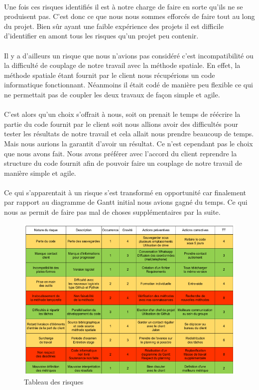     \paragraph{}
    Une fois ces risques identifiés il est à notre charge de faire en sorte qu'ils ne se produisent pas. C'est donc ce que nous nous sommes efforcés de faire tout au long du projet. Bien sûr ayant une faible expérience des projets il est difficile d'identifier en amont tous les risques qu'un projet peu contenir.
    \paragraph{}
    Il y a d'ailleurs un risque que nous n'avions pas considéré c'est incompatibilité ou la difficulté de couplage de notre travail avec la méthode spatiale. En effet, la méthode spatiale étant fournit par le client nous récupérions un code informatique fonctionnant. Néanmoins il était codé de manière peu flexible ce qui ne permettait pas de coupler les deux travaux de façon simple et agile.
    \paragraph{}
    C'est alors qu'un choix s'offrait à nous, soit on prenait le temps de réécrire la partie du code fournit par le client soit nous allions avoir des difficultés pour tester les résultats de notre travail et cela allait nous prendre beaucoup de temps. Mais nous aurions la garantit d'avoir un résultat. Ce n'est cependant pas le choix que nous avons fait. Nous avons préférer avec l'accord du client reprendre la structure du code fournit afin de pouvoir faire un couplage de notre travail de manière simple et agile.
    \paragraph{}
    Ce qui s'apparentait à un risque s'est transformé en opportunité car finalement par rapport au diagramme de Gantt initial nous avions gagné du temps. Ce qui nous as permit de faire pas mal de choses supplémentaires par la suite.
    \begin{figure}[h] 
        \centering
        \includegraphics[width=\textwidth]{images/matrice.png}
        \caption{Tableau des risques}
    \label{Tab risque}
    \end{figure}

